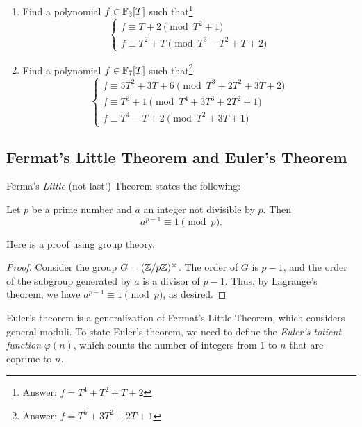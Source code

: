 \begin{exercise}\sage
    \begin{enumerate}
        \item Find a polynomial $f \in \mathbb{F}_3[T]$ such that\footnote{Answer: $f = T^4 + T^2 + T + 2$}
        \[
        \begin{cases}
            f \equiv T + 2 \pmod{T^2 + 1} \\
            f \equiv T^2 + T \pmod{T^3 - T^2 +  T + 2}
        \end{cases} 
        \]
        \item Find a polynomial $f \in \mathbb{F}_{7}[T]$ such that\footnote{Answer: $f = T^5 + 3T^2 + 2T + 1$}
        \[
        \begin{cases}
            f \equiv 5T^2 + 3T + 6 \pmod{T^3 + 2T^2 + 3T + 2} \\
            f \equiv T^3 + 1 \pmod{T^4 + 3T^3 + 2T^2 + 1} \\
            f \equiv T^4 - T + 2 \pmod{T^2 + 3T + 1}
        \end{cases} 
        \]
    \end{enumerate}
\end{exercise}

\subsection{Fermat's Little Theorem and Euler's Theorem}
\label{subsec:basicnt_flittlet}

Ferma's \emph{Little} (not last!) Theorem states the following:
\begin{theorem}
    \label{thm:fermat_little}
    Let $p$ be a prime number and $a$ an integer not divisible by $p$.
    Then
    \[
        a^{p - 1} \equiv 1 \pmod{p}.
    \]
\end{theorem}

Here is a proof using group theory.

\begin{proof}
    Consider the group $G = (\mathbb{Z} / p\mathbb{Z})^\times$.
    The order of $G$ is $p - 1$, and the order of the subgroup generated by $a$ is a divisor of $p - 1$.
    Thus, by Lagrange's theorem, we have $a^{p - 1} \equiv 1 \pmod{p}$, as desired.
\end{proof}

Euler's theorem is a generalization of Fermat's Little Theorem, which considers general moduli.
To state Euler's theorem, we need to define the \emph{Euler's totient function} $\varphi(n)$, which counts the number of integers from $1$ to $n$ that are coprime to $n$.

